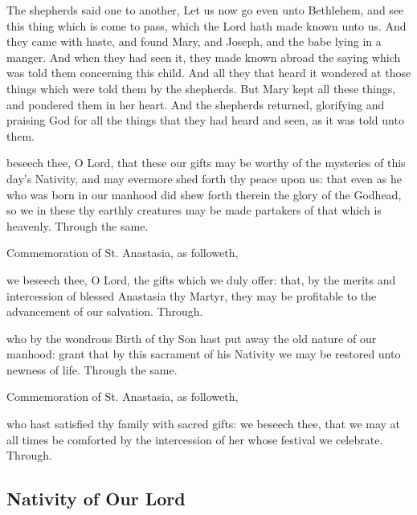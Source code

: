 \clearpage
{}
 The shepherds said one to another, Let us now go even unto Bethlehem, and see this thing which is come to pass, which the Lord hath made known unto us. And they came with haste, and found Mary, and Joseph, and the babe lying in a manger. And when they had seen it, they made known abroad the saying which was told them concerning this child. And all they that heard it wondered at those things which were told them by the shepherds. But Mary kept all these things, and pondered them in her heart. And the shepherds returned, glorifying and praising God for all the things that they had heard and seen, as it was told unto them.


\secret
{} beseech thee, O Lord, that these our gifts may be worthy of the mysteries of this day's Nativity, and may evermore shed forth thy peace upon us: that even as he who was born in our manhood did shew forth therein the glory of the Godhead, so we in these thy earthly creatures may be made partakers of that which is heavenly. Through the same.
\begin{rubric}
	Commemoration of St. Anastasia, as followeth,
\end{rubric}
 we beseech thee, O Lord, the gifts which we duly offer: that, by the merits and intercession of blessed Anastasia thy Martyr, they may be profitable to the advancement of our salvation. Through.


\postcommunion
{} who by the wondrous Birth of thy Son hast put away the old nature of our manhood: grant that by this sacrament of his Nativity we may be restored unto newness of life. Through the same.
\begin{rubric}
	Commemoration of St. Anastasia, as followeth,
\end{rubric}
 who hast satisfied thy family with sacred gifts: we beseech thee, that we may at all times be comforted by the intercession of her whose festival we celebrate. Through.


\clearpage
\subsection{Nativity of Our Lord}\label{NativityMassIII}

